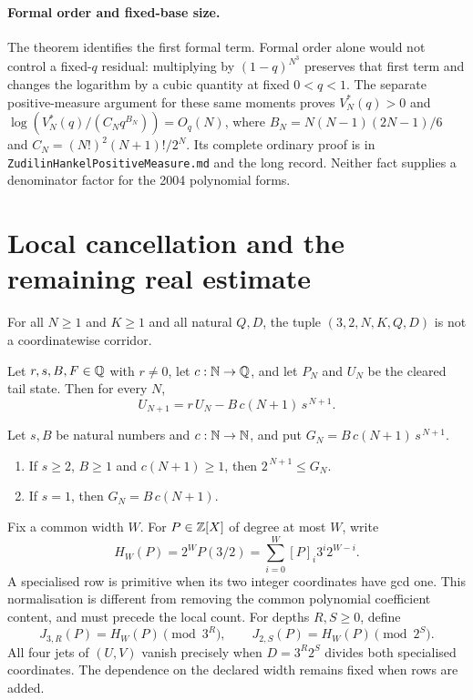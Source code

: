\documentclass[11pt]{article}
\begin{document}
\paragraph{Formal order and fixed-base size.}
The theorem identifies the first formal term.  Formal order alone would not
control a fixed-$q$ residual: multiplying by $(1-q)^{N^3}$ preserves that first
term and changes the logarithm by a cubic quantity at fixed $0<q<1$.
The separate positive-measure argument for these same moments proves
$V_N^*(q)>0$ and
$\log(V_N^*(q)/(C_Nq^{B_N}))=O_q(N)$, where
$B_N=N(N-1)(2N-1)/6$ and $C_N=(N!)^2(N+1)!/2^N$.
Its complete ordinary proof is in
\texttt{ZudilinHankelPositiveMeasure.md} and the long record.
Neither fact supplies a denominator factor for the 2004 polynomial forms.



\section{Local cancellation and the remaining real estimate}
\label{sec:open}

\begin{theorem}\label{res:nocorridor}
For all $N\ge1$ and $K\ge1$ and all natural $Q,D$, the tuple
$(3,2,N,K,Q,D)$ is not a coordinatewise corridor.
\end{theorem}

\begin{theorem}\label{res:tailrec}
Let $r,s,B,F\in\mathbb{Q}$ with $r\ne0$, let $c:\mathbb{N}\to\mathbb{Q}$, and let $P_N$ and $U_N$ be
the cleared tail state.  Then for every $N$,
\[
 U_{N+1}=r\,U_N-B\,c(N+1)\,s^{\,N+1}.
\]
\end{theorem}

\begin{theorem}\label{res:forcing}
Let $s,B$ be natural numbers and $c:\mathbb{N}\to\mathbb{N}$, and put
$G_N=B\,c(N+1)\,s^{\,N+1}$.
\begin{enumerate}
\item If $s\ge2$, $B\ge1$ and $c(N+1)\ge1$, then $2^{\,N+1}\le G_N$.
\item If $s=1$, then $G_N=B\,c(N+1)$.
\end{enumerate}
\end{theorem}

Fix a common width $W$.  For $P\in\mathbb{Z}[X]$ of degree at most $W$, write
\[
 H_W(P)=2^WP(3/2)=\sum_{i=0}^W[P]_i3^i2^{W-i}.
\]
A specialised row is primitive when its two integer coordinates have gcd
one.  This normalisation is different from removing the common polynomial
coefficient content, and must precede the local count.
For depths $R,S\ge0$, define
\[
 J_{3,R}(P)=H_W(P)\pmod{3^R},\qquad
 J_{2,S}(P)=H_W(P)\pmod{2^S}.
\]
All four jets of $(U,V)$ vanish precisely when $D=3^R2^S$ divides both
specialised coordinates.  The dependence on the declared width remains fixed
when rows are added.
\end{document}
